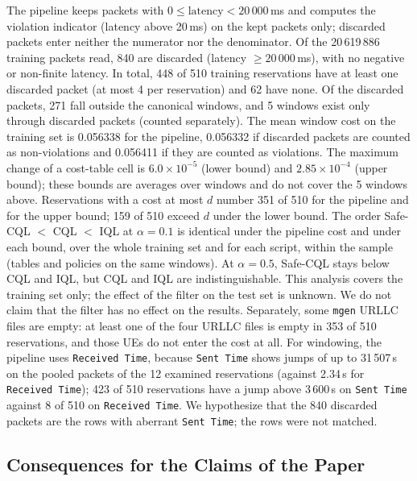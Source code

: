 The pipeline keeps packets with $0\le\text{latency}<20\,000$\,ms and computes the violation indicator (latency above 20\,ms) on the kept packets only; discarded packets enter neither the numerator nor the denominator.%
Of the 20\,619\,886 training packets read, 840 are discarded (latency $\ge 20\,000$\,ms), with no negative or non-finite latency.%
In total, 448 of 510 training reservations have at least one discarded packet (at most 4 per reservation) and 62 have none.%
Of the discarded packets, 271 fall outside the canonical windows, and 5 windows exist only through discarded packets (counted separately).%
The mean window cost on the training set is 0.056338 for the pipeline, 0.056332 if discarded packets are counted as non-violations and 0.056411 if they are counted as violations.%
The maximum change of a cost-table cell is $6.0\times10^{-5}$ (lower bound) and $2.85\times10^{-4}$ (upper bound); these bounds are averages over windows and do not cover the 5 windows above.%
Reservations with a cost at most $d$ number 351 of 510 for the pipeline and for the upper bound; 159 of 510 exceed $d$ under the lower bound.%
The order Safe-CQL $<$ CQL $<$ IQL at $\alpha=0.1$ is identical under the pipeline cost and under each bound, over the whole training set and for each script, within the sample (tables and policies on the same windows).%
At $\alpha=0.5$, Safe-CQL stays below CQL and IQL, but CQL and IQL are indistinguishable.%
This analysis covers the training set only; the effect of the filter on the test set is unknown.%
We do not claim that the filter has no effect on the results.%
Separately, some \texttt{mgen} URLLC files are empty: at least one of the four URLLC files is empty in 353 of 510 reservations, and those UEs do not enter the cost at all.%
For windowing, the pipeline uses \texttt{Received Time}, because \texttt{Sent Time} shows jumps of up to 31\,507\,s on the pooled packets of the 12 examined reservations (against 2.34\,s for \texttt{Received Time}); 423 of 510 reservations have a jump above 3\,600\,s on \texttt{Sent Time} against 8 of 510 on \texttt{Received Time}.%
We hypothesize that the 840 discarded packets are the rows with aberrant \texttt{Sent Time}; the rows were not matched.%

\subsection{Consequences for the Claims of the Paper}
\label{sec:consequences}

